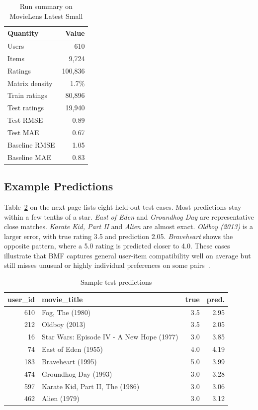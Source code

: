 \documentclass[conference]{IEEEtran}
\begin{document}
\begin{table}[htbp]
\caption{Run summary on MovieLens Latest Small}
\label{tab:run-summary}
\begin{center}
\begin{tabular}{|l|r|}
\hline
\textbf{Quantity} & \textbf{Value} \\
\hline
Users & 610 \\
Items & 9,724 \\
Ratings & 100,836 \\
Matrix density & 1.7\% \\
Train ratings & 80,896 \\
Test ratings & 19,940 \\
Test RMSE & 0.89 \\
Test MAE & 0.67 \\
Baseline RMSE & 1.05 \\
Baseline MAE & 0.83 \\
\hline
\end{tabular}
\end{center}
\end{table}

\subsection{Example Predictions}

Table~\ref{tab:examples} on the next page lists eight held-out test cases. Most predictions stay within a few tenths of a star. \textit{East of Eden} and \textit{Groundhog Day} are representative close matches. \textit{Karate Kid, Part II} and \textit{Alien} are almost exact. \textit{Oldboy (2013)} is a larger error, with true rating 3.5 and prediction 2.05. \textit{Braveheart} shows the opposite pattern, where a 5.0 rating is predicted closer to 4.0. These cases illustrate that BMF captures general user-item compatibility well on average but still misses unusual or highly individual preferences on some pairs~\cite{ref2}.

\begin{table}[htbp]
\caption{Sample test predictions}
\label{tab:examples}
\begin{center}
\begin{tabular}{|r|l|r|r|}
\hline
\textbf{user\_id} & \textbf{movie\_title} & \textbf{true} & \textbf{pred.} \\
\hline
610 & Fog, The (1980) & 3.5 & 2.95 \\
212 & Oldboy (2013) & 3.5 & 2.05 \\
16 & Star Wars: Episode IV - A New Hope (1977) & 3.0 & 3.85 \\
74 & East of Eden (1955) & 4.0 & 4.19 \\
183 & Braveheart (1995) & 5.0 & 3.99 \\
474 & Groundhog Day (1993) & 3.0 & 3.28 \\
597 & Karate Kid, Part II, The (1986) & 3.0 & 3.06 \\
462 & Alien (1979) & 3.0 & 3.12 \\
\hline
\end{tabular}
\end{center}
\end{table}
\end{document}
